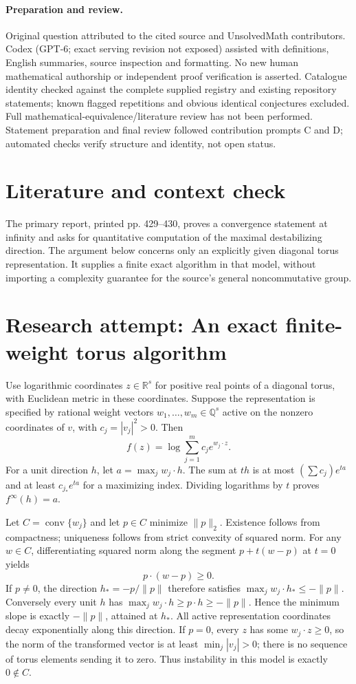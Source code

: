 \documentclass[11pt]{article}
\begin{document}
\paragraph{Preparation and review.}
Original question attributed to the cited source and UnsolvedMath contributors. Codex (GPT-6; exact serving revision not exposed) assisted with definitions, English summaries, source inspection and formatting. No new human mathematical authorship or independent proof verification is asserted. Catalogue identity checked against the complete supplied registry and existing repository statements; known flagged repetitions and obvious identical conjectures excluded. Full mathematical-equivalence/literature review has not been performed. Statement preparation and final review followed contribution prompts C and D; automated checks verify structure and identity, not open status.
\label{end:statement}

\section{Literature and context check}
The primary report, printed pp. 429--430, proves a convergence statement at infinity and asks for quantitative computation of the maximal destabilizing direction. The argument below concerns only an explicitly given diagonal torus representation. It supplies a finite exact algorithm in that model, without importing a complexity guarantee for the source's general noncommutative group.
\section{Research attempt: An exact finite-weight torus algorithm}

Use logarithmic coordinates $z\in\mathbb R^s$ for positive real points of a diagonal torus, with Euclidean metric in these coordinates. Suppose the representation is specified by rational weight vectors $w_1,\ldots,w_m\in\mathbb Q^s$ active on the nonzero coordinates of $v$, with $c_j=|v_j|^2>0$. Then
\[
f(z)=\log\sum_{j=1}^m c_j e^{w_j\cdot z}.
\]
For a unit direction $h$, let $a=\max_j w_j\cdot h$. The sum at $th$ is at most $(\sum c_j)e^{ta}$ and at least $c_{j_*}e^{ta}$ for a maximizing index. Dividing logarithms by $t$ proves $f^\infty(h)=a$.

Let $C=\operatorname{conv}\{w_j\}$ and let $p\in C$ minimize $\|p\|_2$. Existence follows from compactness; uniqueness follows from strict convexity of squared norm. For any $w\in C$, differentiating squared norm along the segment $p+t(w-p)$ at $t=0$ yields
\[
p\cdot(w-p)\geq0.
\]
If $p\ne0$, the direction $h_*=-p/\|p\|$ therefore satisfies $\max_j w_j\cdot h_*\leq-\|p\|$. Conversely every unit $h$ has $\max_j w_j\cdot h\geq p\cdot h\geq-\|p\|$. Hence the minimum slope is exactly $-\|p\|$, attained at $h_*$. All active representation coordinates decay exponentially along this direction. If $p=0$, every $z$ has some $w_j\cdot z\geq0$, so the norm of the transformed vector is at least $\min_j|v_j|>0$; there is no sequence of torus elements sending it to zero. Thus instability in this model is exactly $0\notin C$.
\end{document}
